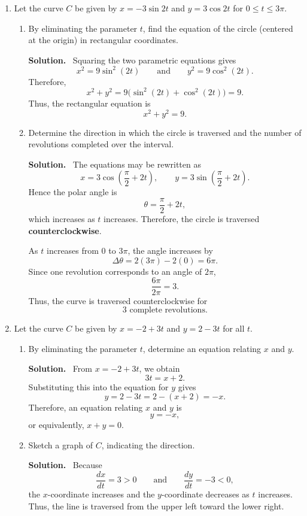 \documentclass[11pt]{amsart}
\newcommand{\solution}{\par\noindent\textbf{Solution.}\ }
\begin{document}
\begin{enumerate}

\item Let the curve $C$ be given by $x=-3\sin 2t$ and $y=3\cos 2t$ for $0\leq t\leq 3\pi$.
\begin{enumerate}
\item By eliminating the parameter $t$, find the equation of the circle (centered at the origin) in rectangular coordinates.

\solution
Squaring the two parametric equations gives
\[
x^2=9\sin^2(2t)
\qquad\text{and}\qquad
y^2=9\cos^2(2t).
\]
Therefore,
\[
x^2+y^2=9\bigl(\sin^2(2t)+\cos^2(2t)\bigr)=9.
\]
Thus, the rectangular equation is
\[
\boxed{x^2+y^2=9}.
\]

\item Determine the direction in which the circle is traversed and the number of revolutions completed over the interval.

\solution
The equations may be rewritten as
\[
x=3\cos\left(\frac{\pi}{2}+2t\right),
\qquad
y=3\sin\left(\frac{\pi}{2}+2t\right).
\]
Hence the polar angle is
\[
\theta=\frac{\pi}{2}+2t,
\]
which increases as $t$ increases. Therefore, the circle is traversed \textbf{counterclockwise}.

As $t$ increases from $0$ to $3\pi$, the angle increases by
\[
\Delta\theta=2(3\pi)-2(0)=6\pi.
\]
Since one revolution corresponds to an angle of $2\pi$,
\[
\frac{6\pi}{2\pi}=3.
\]
Thus, the curve is traversed counterclockwise for
\[
\boxed{3\text{ complete revolutions}}.
\]
\end{enumerate}

\item Let the curve $C$ be given by $x=-2+3t$ and $y=2-3t$ for all $t$.
\begin{enumerate}
\item By eliminating the parameter $t$, determine an equation relating $x$ and $y$.

\solution
From $x=-2+3t$, we obtain
\[
3t=x+2.
\]
Substituting this into the equation for $y$ gives
\[
y=2-3t=2-(x+2)=-x.
\]
Therefore, an equation relating $x$ and $y$ is
\[
\boxed{y=-x},
\]
or equivalently, $\boxed{x+y=0}$.

\item Sketch a graph of $C$, indicating the direction.

\solution
Because
\[
\frac{dx}{dt}=3>0
\qquad\text{and}\qquad
\frac{dy}{dt}=-3<0,
\]
the $x$-coordinate increases and the $y$-coordinate decreases as $t$ increases. Thus, the line is traversed from the upper left toward the lower right.


\end{enumerate}
\end{enumerate}
\end{document}
